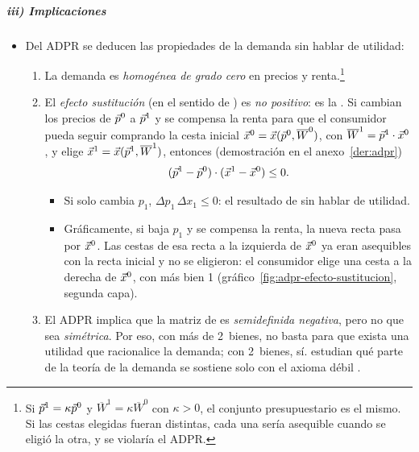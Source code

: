 \documentclass[11pt]{article}
\begin{document}
\subparagraph{iii) Implicaciones}

\begin{itemize}
\item Del ADPR se deducen las propiedades de la demanda sin hablar de utilidad:
  \begin{enumerate}
  \item La demanda es \emph{homogénea de grado cero} en precios y renta.\footnote{Si $\vec{p}^1=\kappa\vec{p}^0$ y $\overline{W}^1=\kappa\overline{W}^0$ con $\kappa>0$, el conjunto presupuestario es el mismo. Si las cestas elegidas fueran distintas, cada una sería asequible cuando se eligió la otra, y se violaría el ADPR.\findemo}
  \item El \emph{efecto sustitución} (en el sentido de ) es \emph{no positivo}: es la . Si cambian los precios de $\vec{p}^0$ a $\vec{p}^1$ y se compensa la renta para que el consumidor pueda seguir comprando la cesta inicial $\vec{x}^0=\vec{x}(\vec{p}^0,\overline{W}^0)$, con $\overline{W}^1=\vec{p}^1\cdot \vec{x}^0$, y elige $\vec{x}^1=\vec{x}(\vec{p}^1,\overline{W}^1)$, entonces (demostración en el anexo~\ref{der:adpr})\nocite{MasColellWhinstonGreen1995}
    \begin{equation}
    (\vec{p}^1-\vec{p}^0)\cdot(\vec{x}^1-\vec{x}^0)\leq 0. \label{eq:ley-demanda-compensada}
    \end{equation}
    \begin{itemize}
    \item Si solo cambia $p_1$, $\Delta p_1\,\Delta x_1\leq 0$: el resultado de  sin hablar de utilidad.
    \item Gráficamente, si baja $p_1$ y se compensa la renta, la nueva recta pasa por $\vec{x}^0$. Las cestas de esa recta a la izquierda de $\vec{x}^0$ ya eran asequibles con la recta inicial y no se eligieron: el consumidor elige una cesta a la derecha de $\vec{x}^0$, con más bien 1 (gráfico~\ref{fig:adpr-efecto-sustitucion}, segunda capa).
    \end{itemize}
  \item El ADPR implica que la matriz de  es \emph{semidefinida negativa}, pero no que sea \emph{simétrica}\nocite{MasColellWhinstonGreen1995}. Por eso, con más de 2~bienes, no basta para que exista una utilidad que racionalice la demanda; con 2~bienes, sí\nocite{Rose1958Consistency}. \textcite{KihlstromMasColellSonnenschein1976} estudian qué parte de la teoría de la demanda se sostiene solo con el axioma débil .
  \end{enumerate}
\end{itemize}
\end{document}
